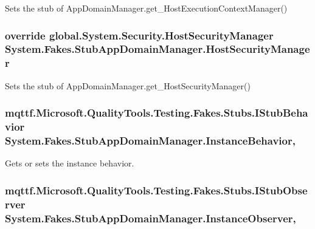 Sets the stub of App\-Domain\-Manager.\-get\-\_\-\-Host\-Execution\-Context\-Manager()

\hypertarget{class_system_1_1_fakes_1_1_stub_app_domain_manager_a75a3a4de633258f7ab667bf9c7784180}{
\subsubsection[{Host\-Security\-Manager}]{\setlength{\rightskip}{0pt plus 5cm}override global.\-System.\-Security.\-Host\-Security\-Manager System.\-Fakes.\-Stub\-App\-Domain\-Manager.\-Host\-Security\-Manager\hspace{0.3cm}{\ttfamily [get]}}}\label{class_system_1_1_fakes_1_1_stub_app_domain_manager_a75a3a4de633258f7ab667bf9c7784180}


Sets the stub of App\-Domain\-Manager.\-get\-\_\-\-Host\-Security\-Manager()

\hypertarget{class_system_1_1_fakes_1_1_stub_app_domain_manager_a9c80a41656814424b658b145d935191c}{
\subsubsection[{Instance\-Behavior}]{\setlength{\rightskip}{0pt plus 5cm}mqttf.\-Microsoft.\-Quality\-Tools.\-Testing.\-Fakes.\-Stubs.\-I\-Stub\-Behavior System.\-Fakes.\-Stub\-App\-Domain\-Manager.\-Instance\-Behavior\hspace{0.3cm}{\ttfamily [get]}, {\ttfamily [set]}}}\label{class_system_1_1_fakes_1_1_stub_app_domain_manager_a9c80a41656814424b658b145d935191c}


Gets or sets the instance behavior.

\hypertarget{class_system_1_1_fakes_1_1_stub_app_domain_manager_a530f39f8e58cd376f586cb05dd0a3ae1}{
\subsubsection[{Instance\-Observer}]{\setlength{\rightskip}{0pt plus 5cm}mqttf.\-Microsoft.\-Quality\-Tools.\-Testing.\-Fakes.\-Stubs.\-I\-Stub\-Observer System.\-Fakes.\-Stub\-App\-Domain\-Manager.\-Instance\-Observer\hspace{0.3cm}{\ttfamily [get]}, {\ttfamily [set]}}}\label{class_system_1_1_fakes_1_1_stub_app_domain_manager_a530f39f8e58cd376f586cb05dd0a3ae1}


